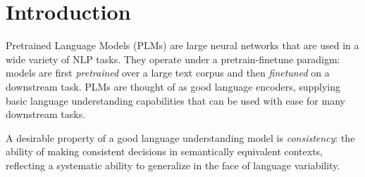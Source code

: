 \section{Introduction}
\label{sec:intro}

Pretrained Language Models (PLMs) are
large neural networks that are
used in a wide variety of NLP tasks. They operate under a
pretrain-finetune paradigm: models are first \emph{pretrained} over a large text corpus and then \emph{finetuned} on a downstream task. PLMs are thought of as good language encoders, supplying basic language understanding capabilities that can be used with ease for many downstream tasks.

A desirable property of a good language understanding model
is \emph{consistency}: the ability of  making consistent
decisions in semantically equivalent contexts, reflecting a
systematic ability to generalize in the face of language variability.

